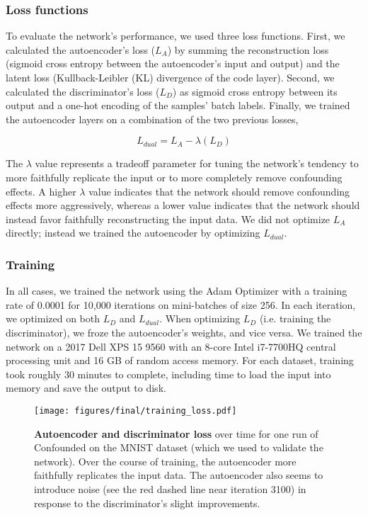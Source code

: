 \subsubsection{Loss functions}

To evaluate the network's performance, we used three loss functions.
First, we calculated the autoencoder's loss ($L_A$) by summing the reconstruction loss (sigmoid cross entropy between the autoencoder's input and output) and the latent loss (Kullback-Leibler (KL) divergence \cite{kullback_information_1951} of the code layer).
Second, we calculated the discriminator's loss ($L_D$) as sigmoid cross entropy between its output and a one-hot encoding of the samples' batch labels.
Finally, we trained the autoencoder layers on a combination of the two previous losses,

\begin{equation}
	\label{dual_loss}
	L_{dual} = L_A - \lambda{}(L_D)
\end{equation}

The $\lambda$ value represents a tradeoff parameter for tuning the network's tendency to more faithfully replicate the input or to more completely remove confounding effects.
A higher $\lambda$ value indicates that the network should remove confounding effects more aggressively, whereas a lower value indicates that the network should instead favor faithfully reconstructing the input data.
We did not optimize $L_A$ directly; instead we trained the autoencoder by optimizing $L_{dual}$.

\subsubsection{Training}
In all cases, we trained the network using the Adam Optimizer \citep{kingma_adam_2014} with a training rate of 0.0001 for 10,000 iterations on mini-batches of size 256. %
In each iteration, we optimized on both $L_D$ and $L_{dual}$.
When optimizing $L_D$ (i.e. training the discriminator), we froze the autoencoder's weights, and vice versa.
We trained the network on a 2017 Dell XPS 15 9560 with an 8-core Intel i7-7700HQ central processing unit and 16 GB of random access memory.
For each dataset, training took roughly 30 minutes to complete, including time to load the input into memory and save the output to disk. %

\begin{figure}
	\centering
	\texttt{[image: figures/final/training\_loss.pdf]}
	\caption[Autoencoder and discriminator loss]{\textbf{Autoencoder and discriminator loss} over time for one run of Confounded on the MNIST dataset (which we used to validate the network).
	Over the course of training, the autoencoder more faithfully replicates the input data.
	The autoencoder also seems to introduce noise (see the red dashed line near iteration 3100) in response to the discriminator's slight improvements.}
	\label{fig:training_loss}
\end{figure}

